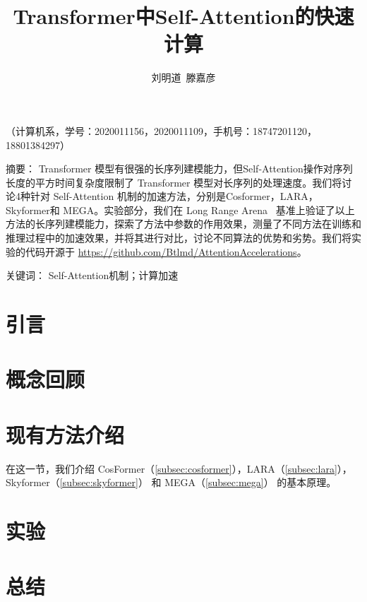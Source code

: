 \documentclass[twoside]{article}
\title{Transformer中Self-Attention的快速计算}
\author{刘明道\ 滕嘉彦}
\newcommand{\printtitle}[1]{
    \vspace{10pt}
    \noindent{\heiti\zihao{3} #1}
}
\newcommand{\printauthor}[1]{
    \vspace{6pt}
    \noindent{\fangsong\zihao{4}\scalebox{0.66}[1] #1}
    \vspace{6pt}
}
\newcommand{\printcontact}[1]{{\songti\fontsize{10pt}{12pt}\selectfont\raggedright #1}}
\newcommand{\intro}[2]{
  \vspace{0.5\baselineskip}
  \noindent
  {\heiti \zihao{5} #1}
  {\songti \zihao{5} #2}
  \vspace{0.2\baselineskip}
}
\newcommand{\s}[1]{\section{\normalfont #1}}
\theoremstyle{plain}
\begin{document}
\printtitle{\thetitle}

\printauthor{\theauthor}

\printcontact{（计算机系，学号：2020011156，2020011109，手机号：18747201120，18801384297）}

\songti{}

\intro{摘\quad 要：}{Transformer 模型有很强的长序列建模能力，但Self-Attention操作对序列长度的平方时间复杂度限制了 Transformer 模型对长序列的处理速度。我们将讨论4种针对 Self-Attention 机制的加速方法，分别是Cosformer，LARA，Skyformer和 MEGA。实验部分，我们在 Long Range Arena~\cite{tay2021long} 基准上验证了以上方法的长序列建模能力，探索了方法中参数的作用效果，测量了不同方法在训练和推理过程中的加速效果，并将其进行对比，讨论不同算法的优势和劣势。我们将实验的代码开源于 \url{https://github.com/Btlmd/AttentionAccelerations}。}

\intro{关键词：}{Self-Attention机制；计算加速}
\vspace{-10pt}

\s{引言} 
    
\s{概念回顾} 
    
\s{现有方法介绍}

在这一节，我们介绍 CosFormer（\ref{subsec:cosformer}），LARA（\ref{subsec:lara}），Skyformer（\ref{subsec:skyformer}） 和 MEGA（\ref{subsec:mega}） 的基本原理。

    
    
    
    
    
\s{实验}
    

\s{总结}
    

\printbibliography[heading=refheading]
\end{document}
